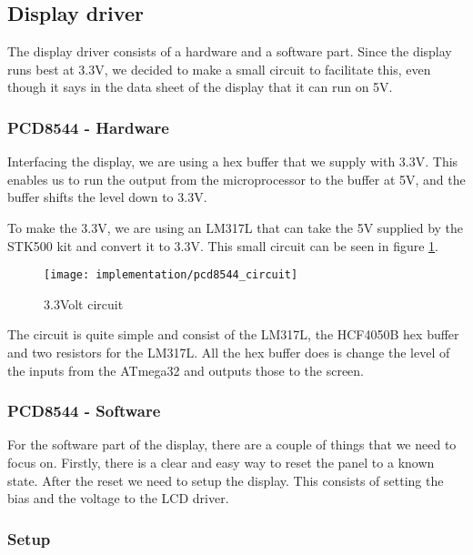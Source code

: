 \subsection{Display driver}

The display driver consists of a hardware and a software part. Since the display runs best at 3.3V, we decided to make a small circuit to facilitate this, even though it says in the data sheet of the display\cite[p. 17]{philips:pcd8544} that it can run on 5V.

\subsubsection{PCD8544 - Hardware}

Interfacing the display, we are using a hex buffer that we supply with 3.3V. This enables us to run the output from the microprocessor to the buffer at 5V, and the buffer shifts the level down to 3.3V\cite[p. 1]{STMicroelectronics:HCF4050B}.

To make the 3.3V, we are using an LM317L that can take the 5V supplied by the STK500 kit and convert it to 3.3V. This small circuit can be seen in figure \ref{fig:pcd8544_circuit}.

\begin{figure}
	\centering
	\texttt{[image: implementation/pcd8544\_circuit]}
	\caption{3.3Volt circuit}
	\label{fig:pcd8544_circuit}
\end{figure}

The circuit is quite simple and consist of the LM317L, the HCF4050B hex buffer and two resistors for the LM317L. All the hex buffer does is change the level of the inputs from the ATmega32 and outputs those to the screen.

\subsubsection{PCD8544 - Software}

For the software part of the display, there are a couple of things that we need to focus on. Firstly, there is a clear and easy way to reset the panel to a known state. After the reset we need to setup the display. 
This consists of setting the bias and the voltage to the LCD driver.

\subsubsection{Setup}

